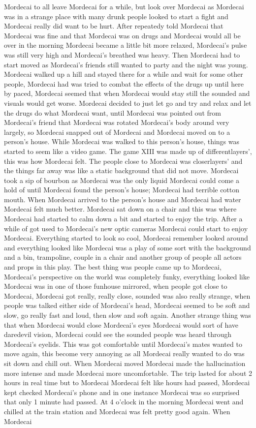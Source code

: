 \documentclass[12pt]{book}
\begin{document}
Mordecai to all leave Mordecai for a while, but look over Mordecai as Mordecai was in a strange place with many drunk people looked to start a fight and Mordecai really did want to be hurt. After repeatedy told Mordecai that Mordecai was fine and that Mordecai was on drugs and Mordecai would all be over in the morning Mordecai became a little bit more relaxed, Mordecai's pulse was still very high and Mordecai's breathed was heavy. Then Mordecai had to start moved as Mordecai's friends still wanted to party and the night was young. Mordecai walked up a hill and stayed there for a while and wait for some other people, Mordecai had was tried to combat the effects of the drugs up until here by paced, Mordecai seemed that when Mordecai would stay still the sounded and visuals would get worse. Mordecai decided to just let go and try and relax and let the drugs do what Mordecai want, until Mordecai was pointed out from Mordecai's friend that Mordecai was rotated Mordecai's body around very largely, so Mordecai snapped out of Mordecai and Mordecai moved on to a person's house. While Mordecai was walked to this person's house, things was started to seem like a video game. The game XIII was made up of differentlayers', this was how Mordecai felt. The people close to Mordecai was closerlayers' and the things far away was like a static background that did not move. Mordecai took a sip of bourbon as Mordecai was the only liquid Mordecai could come a hold of until Mordecai found the person's house; Mordecai had terrible cotton mouth. When Mordecai arrived to the person's house and Mordecai had water Mordecai felt much better. Mordecai sat down on a chair and this was where Mordecai had started to calm down a bit and started to enjoy the trip. After a while of got used to Mordecai's new optic cameras Mordecai could start to enjoy Mordecai. Everything started to look so cool, Mordecai remember looked around and everything looked like Mordecai was a play of some sort with the background and a bin, trampoline, couple in a chair and another group of people all actors and props in this play. The best thing was people came up to Mordecai, Mordecai's perspective on the world was completely funky, everything looked like Mordecai was in one of those funhouse mirrored, when people got close to Mordecai, Mordecai got really, really close, sounded was also really strange, when people was talked either side of Mordecai's head, Mordecai seemed to be soft and slow, go really fast and loud, then slow and soft again. Another strange thing was that when Mordecai would close Mordecai's eyes Mordecai would sort of have daredevil vision, Mordecai could see the sounded people was heard through Mordecai's eyelids. This was got comfortable until Mordecai's mates wanted to move again, this become very annoying as all Mordecai really wanted to do was sit down and chill out. When Mordecai moved Mordecai made the hallucination more intense and made Mordecai more uncomfortable. The trip lasted for about 2 hours in real time but to Mordecai Mordecai felt like hours had passed, Mordecai kept checked Mordecai's phone and in one instance Mordecai was so surprised that only 1 minute had passed. At 4 o'clock in the morning Mordecai went and chilled at the train station and Mordecai was felt pretty good again. When Mordecai 
\end{document}
